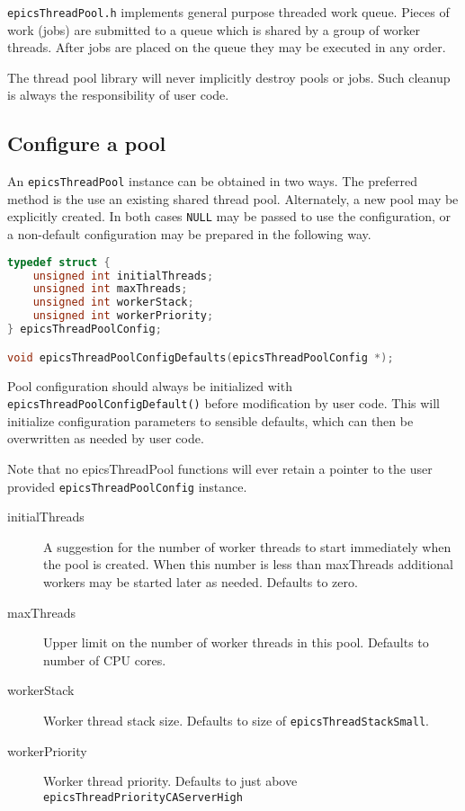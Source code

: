 
\verb|epicsThreadPool.h| implements general purpose threaded work queue.
Pieces of work (jobs) are submitted to a queue which is shared by a group of worker threads.
After jobs are placed on the queue they may be executed in any order.

The thread pool library will never implicitly destroy pools or jobs.
Such cleanup is always the responsibility of user code.

\subsection{Configure a pool}

An \verb|epicsThreadPool| instance can be obtained in two ways. The preferred
method is the use an existing shared thread pool. Alternately, a new
pool may be explicitly created. In both cases \verb|NULL| may be passed to use
the configuration, or a non-default configuration may be prepared in the following way.

\begin{lstlisting}[language=C]
typedef struct {
    unsigned int initialThreads;
    unsigned int maxThreads;
    unsigned int workerStack;
    unsigned int workerPriority;
} epicsThreadPoolConfig;

void epicsThreadPoolConfigDefaults(epicsThreadPoolConfig *);
\end{lstlisting}


Pool configuration should always be initialized with \verb|epicsThreadPoolConfigDefault()|
before modification by user code. This will initialize configuration
parameters to sensible defaults, which can then be overwritten as
needed by user code.

Note that no epicsThreadPool functions will ever retain a pointer
to the user provided \verb|epicsThreadPoolConfig| instance.

\begin{description}
\item [{initialThreads}] A suggestion for the number of worker threads to start
immediately when the pool is created. When this number is less than
maxThreads additional workers may be started later as needed. Defaults to zero.
\item [{maxThreads}] Upper limit on the number of worker threads in this
pool. Defaults to number of CPU cores.
\item [{workerStack}] Worker thread stack size. Defaults to size of \verb|epicsThreadStackSmall|.
\item [{workerPriority}] Worker thread priority. Defaults to just above \verb|epicsThreadPriorityCAServerHigh|
\end{description}


